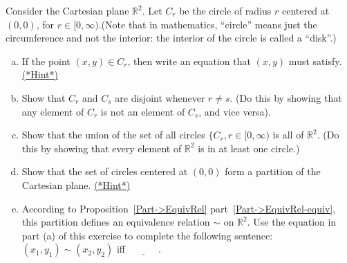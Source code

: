 \begin{exercise}{67}
Consider the Cartesian plane $\mathbb{R}^2$. Let $C_r$ be the circle of radius $r$ centered at $(0,0)$, for $r \in [0,\infty)$.(Note that in mathematics, ``circle'' means just the circumference and not the interior: the interior of the circle is called a ``disk''.)
\begin{enumerate}[(a)]
\item
If the point $(x,y) \in C_r$, then write an equation that $(x,y)$ must satisfy.
\hyperref[secEqRelChapHints]{(*Hint*)}
\item
Show that $C_{r}$ and $C_{s}$ are disjoint whenever $r \neq s$. (Do this by showing that any element of $C_{r}$ is not an element of $C_{s}$, and vice versa).
\item
Show that the union of the set of all circles $\{C_r, r \in [0,\infty)$ is all of $\mathbb{R}^2$. (Do this by showing that every element of $\mathbb{R}^2$ is in at least one circle.)
\item
Show that the set of circles centered at $(0,0)$ form a partition of the Cartesian plane.
\hyperref[secEqRelChapHints]{(*Hint*)}
\item
According to Proposition~\ref{Part->EquivRel} part~\ref{Part->EquivRel-equiv}, this partition  defines an equivalence relation $\sim$ on $\mathbb{R}^2$. Use the equation in part (a) of this exercise to complete the following sentence:  $(x_1,y_1) \sim (x_2,y_2)$ iff $\underline{~~~~~~~~~~~~~~}$.
\end{enumerate}
\end{exercise}





